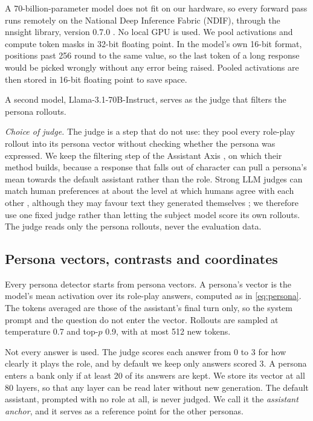 A 70-billion-parameter model does not fit on our hardware, so every forward pass runs remotely on
the National Deep Inference Fabric (NDIF), through the nnsight library, version 0.7.0
\cite{fiottokaufman2024nnsight}. No local GPU is used.
We pool activations and compute token masks in 32-bit floating point. In the model's own 16-bit
format, positions past 256 round to the same value, so the last token of a long response would be
picked wrongly without any error being raised. Pooled activations are then stored in 16-bit
floating point to save space.

A second model, Llama-3.1-70B-Instruct, serves as the judge that filters the persona rollouts.

\emph{Choice of judge.} The judge is a step that \textcite{mahadik2026persona} do not use: they pool
every role-play rollout into its persona vector without checking whether the persona was expressed.
We keep the filtering step of the Assistant Axis \cite{lu2026assistant}, on which their method
builds, because a response that falls out of character can pull a persona's mean towards the default
assistant rather than the role. Strong LLM judges can match human preferences at about the level at
which humans agree with each other \cite{zheng2023judging}, although they may favour text they
generated themselves \cite{panickssery2024llm}; we therefore use one fixed judge rather than letting
the subject model score its own rollouts. The judge reads only the persona rollouts, never the
evaluation data.

\subsection{Persona vectors, contrasts and coordinates}
\label{sec:directions}

Every persona detector starts from persona vectors. A persona's vector is the model's mean
activation over its role-play answers, computed as in \cref{eq:persona}. The tokens averaged are
those of the assistant's final turn only, so the system prompt and the question do not enter the
vector. Rollouts are sampled at temperature 0.7 and top-$p$ 0.9, with at most 512 new tokens.

Not every answer is used. The judge scores each answer from 0 to 3 for how clearly it plays the
role, and by default we keep only answers scored 3. A persona enters a bank only if at least 20 of
its answers are kept. We store its vector at all 80 layers, so that any layer can be read later
without new generation. The default assistant, prompted with no role at all, is never judged. We
call it the \emph{assistant anchor}, and it serves as a reference point for the other personas.

